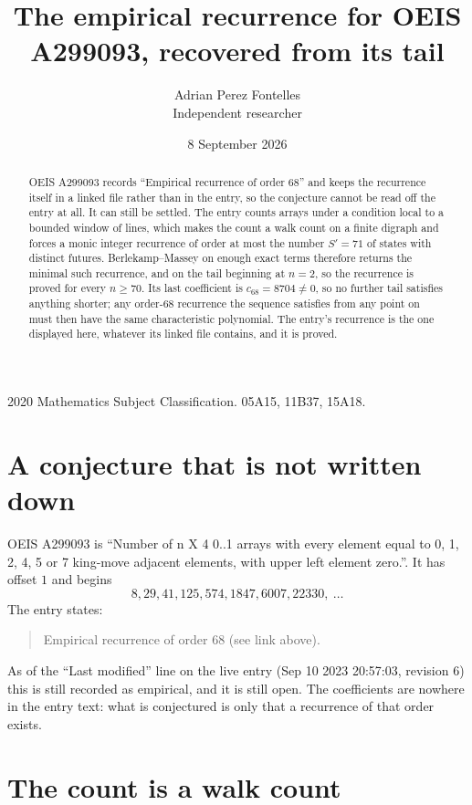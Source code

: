 \documentclass[11pt,a4paper]{article}
\title{The empirical recurrence for OEIS A299093, recovered from its tail}
\author{Adrian Perez Fontelles\\ \small Independent researcher}
\date{8 September 2026}
\theoremstyle{plain}
\theoremstyle{definition}
\begin{document}
\maketitle

\begin{abstract}
OEIS A299093 records ``Empirical recurrence of order $68$'' and keeps the recurrence itself in
a linked file rather than in the entry, so the conjecture cannot be read off the entry at all.
It can still be settled. The entry counts arrays under a condition local to a bounded window of
lines, which makes the count a walk count on a finite digraph and forces a monic integer
recurrence of order at most the number $S'=71$ of states with distinct futures. Berlekamp--Massey on
enough exact terms therefore returns the minimal such recurrence, and on the tail beginning at $n=2$, so the recurrence is proved for every $n\ge70$.
Its last coefficient is $c_{68}=8704\neq0$, so no further tail satisfies anything
shorter; any order-$68$ recurrence the sequence satisfies from any point on must then have
the same characteristic polynomial. The entry's recurrence is the one displayed here, whatever
its linked file contains, and it is proved.
\end{abstract}

\noindent\small 2020 Mathematics Subject Classification. 05A15, 11B37, 15A18.\normalsize

\section{A conjecture that is not written down}

OEIS A299093 is ``Number of n X 4 0..1 arrays with every element equal to 0, 1, 2, 4, 5 or 7 king-move adjacent elements, with upper left element zero.''. It has offset $1$ and begins
\[
8, 29, 41, 125, 574, 1847, 6007, 22330,\ \dots
\]
The entry states:
\begin{quote}
Empirical recurrence of order 68 (see link above).
\end{quote}
As of the ``Last modified'' line on the live entry (Sep 10 2023 20:57:03, revision 6)
this is still recorded as empirical, and it is still open. The coefficients are nowhere in the
entry text: what is conjectured is only that a recurrence of that order exists.

\section{The count is a walk count}
\end{document}
